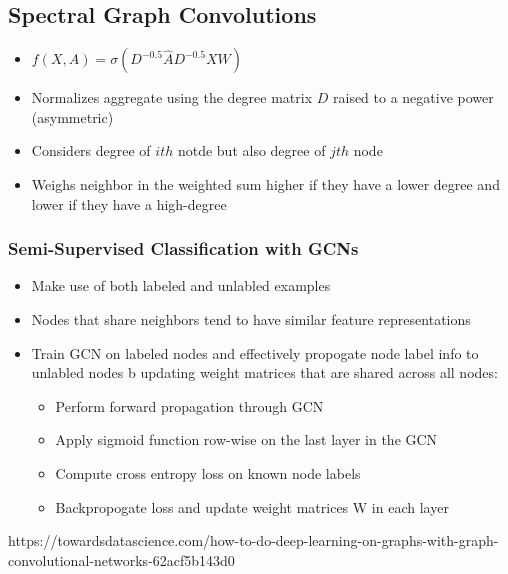 \subsection{Spectral Graph Convolutions}
\begin{itemize}
	\item $f(X, A) = \sigma (D^{-0.5} \hat{A}D^{-0.5}XW)$
	\item Normalizes aggregate using the degree matrix $D$ raised to a negative power (asymmetric)
	\item Considers degree of $ith$ notde but also degree of $jth$ node
	\item Weighs neighbor in the weighted sum higher if they have a lower degree and lower if they have a high-degree
\end{itemize}
\subsubsection{Semi-Supervised Classification with GCNs}
\begin{itemize}
	\item Make use of both labeled and unlabled examples
	\item Nodes that share neighbors tend to have similar feature representations
	\item Train GCN on labeled nodes and effectively propogate node label info to unlabled nodes b updating weight matrices that are shared across all nodes:
\begin{itemize}
	\item Perform forward propagation through GCN
	\item Apply sigmoid function row-wise on the last layer in the GCN
	\item Compute cross entropy loss on known node labels
	\item Backpropogate loss and update weight matrices W in each layer
\end{itemize}
\end{itemize}

https://towardsdatascience.com/how-to-do-deep-learning-on-graphs-with-graph-convolutional-networks-62acf5b143d0